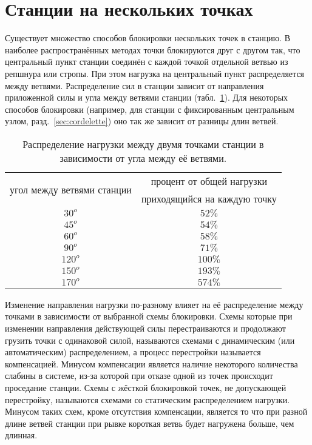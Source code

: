 \documentclass[fleqn, 12pt]{extarticle}
\begin{document}
\section{Станции на нескольких точках}\label{sec:multipoint.anchors}
    Существует множество способов блокировки нескольких точек в станцию. В наиболее распространённых методах точки блокируются друг с другом
    так, что центральный пункт станции соединён с каждой точкой отдельной ветвью из репшнура или стропы. При этом нагрузка на центральный пункт распределяется между ветвями.
    Распределение сил в станции зависит от направления приложенной силы и угла между ветвями станции
    (табл.~\ref{tab:angle}). Для некоторых способов блокировки (например, для станции с фиксированным центральным узлом, разд.~\ref{sec:cordelette}) оно так же зависит от разницы длин ветвей.
    \begin{table}[h]
        \centering
        \begin{tabular}{|c|c|}
            \hline
            \multirow{2}{*}{угол между ветвями станции} & процент от общей нагрузки \\ & приходящийся на каждую точку \\
            \hline
            $30^o$ & $52\%$ \\
            $45^o$ & $54\%$ \\
            $60^o$ & $58\%$ \\
            $90^o$ & $71\%$ \\
            $120^o$ & $100\%$ \\
            $150^o$ & $193\%$ \\
            $170^o$ & $574\%$ \\
            \hline
        \end{tabular}
        \caption{Распределение нагрузки между двумя точками станции в зависимости от угла между её ветвями.}\label{tab:angle}
    \end{table}
    
    Изменение направления нагрузки по-разному влияет на её распределение между точками в зависимости от выбранной схемы блокировки. Схемы которые при изменении направления
    действующей силы перестраиваются и продолжают грузить точки с одинаковой силой, называются схемами с динамическим (или автоматическим) распределением, а процесс перестройки 
    называется компенсацией. Минусом компенсации является наличие некоторого количества слабины в системе, из-за которой при отказе одной из точек происходит проседание станции. 
    Схемы с жёсткой блокировкой точек, не допускающей перестройку, называются схемами со статическим распределением нагрузки. Минусом таких схем, кроме отсутствия компенсации,
    является то что при разной длине ветвей станции при рывке короткая ветвь будет нагружена больше, чем длинная.
\end{document}
